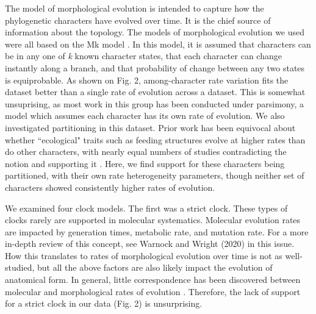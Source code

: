 \documentclass{article}
\begin{document}
The model of morphological evolution is intended to capture how the phylogenetic characters have evolved over time.
It is the chief source of information about the topology.
The models of morphological evolution we used were all based on the Mk model \citep{Lewis2001}. 
In this model, it is assumed that characters can be in any one of \textit{k} known character states, that each character can change instantly along a branch, and that probability of change between any two states is equiprobable.
As shown on Fig. 2, among-character rate variation fits the dataset better than a single rate of evolution across a dataset.
This is somewhat unsuprising, as most work in this group has been conducted under parsimony, a model which assumes each character has its own rate of evolution.
We also investigated partitioning in this dataset.
Prior work has been equivocal about whether ``ecological" traits such as feeding structures evolve at higher rates than do other characters, with nearly equal numbers of studies contradicting the notion \citep{Foote1994,Sanchez-Villagra1998,Ciampaglio2002} and supporting it \citep{Wagner1995,Blomberg2003,HopkinsSmith2015}.
Here, we find support for these characters being partitioned, with their own rate heterogeneity parameters, though neither set of characters showed consistently higher rates of evolution. 

We examined four clock models.
The first was a strict clock. 
These types of clocks rarely are supported in molecular systematics.
Molecular evolution rates are impacted by generation times,  metabolic rate, and mutation rate.
For a more in-depth review of this concept, see Warnock and Wright (2020) in this issue. %
How this translates to rates of morphological evolution over time is not as well-studied, but all the above factors are also likely impact the evolution of anatomical form. 
In general, little correspondence has been discovered between molecular and morphological rates of evolution \citep{bromham2002}.
Therefore, the lack of support for a strict clock in our data (Fig. 2) is unsurprising.
\end{document}

